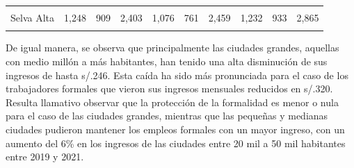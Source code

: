 \documentclass[
  letterpaper,
  12pt,
  oneside,
  spanish,
  doublespacing,
  headsepline,
  parskip]{MastersDoctoralThesis}
\begin{document}
\begin{table}[H]
\begin{tabular}{lccccccccc}
\cellcolor{gray!6}{Selva Baja} & \cellcolor{gray!6}{1,343} & \cellcolor{gray!6}{909} & \cellcolor{gray!6}{2,476} & \cellcolor{gray!6}{1,205} & \cellcolor{gray!6}{870} & \cellcolor{gray!6}{2,400} & \cellcolor{gray!6}{1,327} & \cellcolor{gray!6}{999} & \cellcolor{gray!6}{2,731}\\
Selva Alta & 1,248 & 909 & 2,403 & 1,076 & 761 & 2,459 & 1,232 & 933 & 2,865\\
\addlinespace
\cellcolor{gray!6}{Lima Metropolitana} & \cellcolor{gray!6}{1,910} & \cellcolor{gray!6}{1,206} & \cellcolor{gray!6}{2,847} & \cellcolor{gray!6}{1,671} & \cellcolor{gray!6}{1,041} & \cellcolor{gray!6}{2,491} & \cellcolor{gray!6}{1,643} & \cellcolor{gray!6}{1,098} & \cellcolor{gray!6}{2,488}\\
\bottomrule
\end{tabular}
\endgroup{}
\end{table}

De igual manera, se observa que principalmente las ciudades grandes,
aquellas con medio millón a más habitantes, han tenido una alta
disminución de sus ingresos de hasta s/.246. Esta caída ha sido más
pronunciada para el caso de los trabajadores formales que vieron sus
ingresos mensuales reducidos en s/.320. Resulta llamativo observar que
la protección de la formalidad es menor o nula para el caso de las
ciudades grandes, mientras que las pequeñas y medianas ciudades pudieron
mantener los empleos formales con un mayor ingreso, con un aumento del
6\% en los ingresos de las ciudades entre 20 mil a 50 mil habitantes
entre 2019 y 2021.
\end{document}
